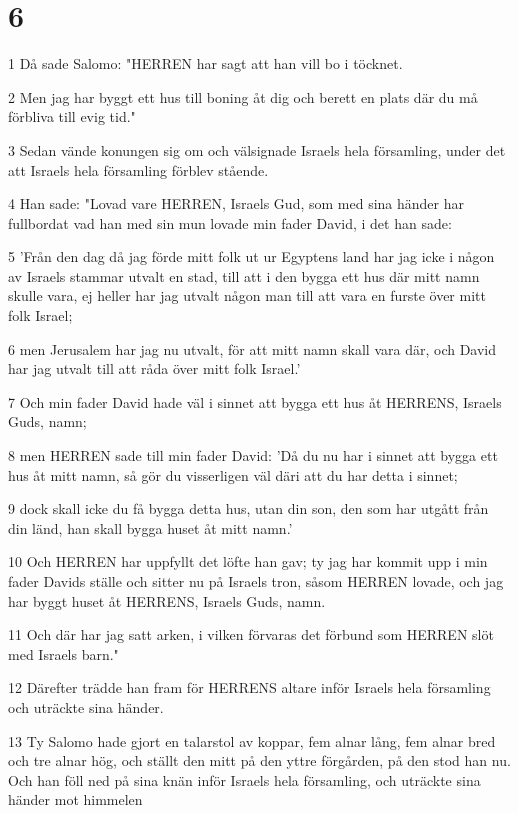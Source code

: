 \chapter{6}

\par 1 Då sade Salomo: "HERREN har sagt att han vill bo i töcknet.
\par 2 Men jag har byggt ett hus till boning åt dig och berett en plats där du må förbliva till evig tid."
\par 3 Sedan vände konungen sig om och välsignade Israels hela församling, under det att Israels hela församling förblev stående.
\par 4 Han sade: "Lovad vare HERREN, Israels Gud, som med sina händer har fullbordat vad han med sin mun lovade min fader David, i det han sade:
\par 5 'Från den dag då jag förde mitt folk ut ur Egyptens land har jag icke i någon av Israels stammar utvalt en stad, till att i den bygga ett hus där mitt namn skulle vara, ej heller har jag utvalt någon man till att vara en furste över mitt folk Israel;
\par 6 men Jerusalem har jag nu utvalt, för att mitt namn skall vara där, och David har jag utvalt till att råda över mitt folk Israel.'
\par 7 Och min fader David hade väl i sinnet att bygga ett hus åt HERRENS, Israels Guds, namn;
\par 8 men HERREN sade till min fader David: 'Då du nu har i sinnet att bygga ett hus åt mitt namn, så gör du visserligen väl däri att du har detta i sinnet;
\par 9 dock skall icke du få bygga detta hus, utan din son, den som har utgått från din länd, han skall bygga huset åt mitt namn.'
\par 10 Och HERREN har uppfyllt det löfte han gav; ty jag har kommit upp i min fader Davids ställe och sitter nu på Israels tron, såsom HERREN lovade, och jag har byggt huset åt HERRENS, Israels Guds, namn.
\par 11 Och där har jag satt arken, i vilken förvaras det förbund som HERREN slöt med Israels barn."
\par 12 Därefter trädde han fram för HERRENS altare inför Israels hela församling och uträckte sina händer.
\par 13 Ty Salomo hade gjort en talarstol av koppar, fem alnar lång, fem alnar bred och tre alnar hög, och ställt den mitt på den yttre förgården, på den stod han nu. Och han föll ned på sina knän inför Israels hela församling, och uträckte sina händer mot himmelen
